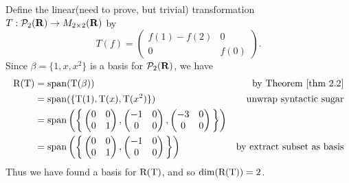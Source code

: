 \begin{example} \label{example 2.1.10}
Define the linear(need to prove, but trivial) transformation \(T : \mathcal{P}_2(\mathbf{R}) \to M_{2 \times 2}(\mathbf{R})\) by
\[
    T(f) = \begin{pmatrix}
        f(1) - f(2) &    0 \\
        0           & f(0)
    \end{pmatrix}.
\]
Since \(\beta = \{1, x, x^2\}\) is a basis for \(\mathcal{P}_2(\mathbf{R})\), we have
\begin{align*}
    \RANGET & = \spann(\T(\beta)) & \text{by \THM{2.2}} \\
            & = \spann(\{\T(1), \T(x), \T(x^2)\}) & \text{unwrap syntactic sugar} \\
            & = \spann\bigg(\bigg\{
                    \begin{pmatrix}
                        0 & 0 \\
                        0 & 1
                    \end{pmatrix},
                    \begin{pmatrix}
                        -1 & 0 \\
                        0  & 0
                    \end{pmatrix},
                    \begin{pmatrix}
                        -3 & 0 \\
                        0  & 0
                    \end{pmatrix}
                \bigg\}\bigg) \\
            & = \spann\bigg(\bigg\{
                    \begin{pmatrix}
                        0 & 0 \\
                        0 & 1
                    \end{pmatrix},
                    \begin{pmatrix}
                        -1 & 0 \\
                        0  & 0
                    \end{pmatrix}
                \bigg\}\bigg) & \text{by extract subset as basis}
\end{align*}
Thus we have found a basis for \(\mathrm{R(T)}\), and so \(\dim(\mathrm{R(T)}) = 2\).


\end{example}
